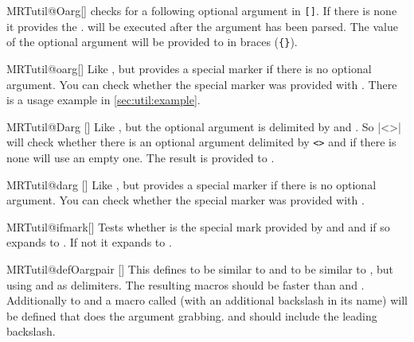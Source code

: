 \begin{describemacro}{MRTutil@Oarg}[]
  checks for a following optional argument in \texttt{[]}. If there is none it
  provides the .  will be executed after the
  argument has been parsed. The value of the optional argument will be provided
  to  in braces (\texttt{\{\}}).
\end{describemacro}

\begin{describemacro}{MRTutil@oarg}[]
  Like , but provides a special marker if there is no optional
  argument. You can check whether the special marker was provided with
  . There is a usage example in \autoref{sec:util:example}.
\end{describemacro}

\begin{describemacro}{MRTutil@Darg}%
  []
  Like , but the optional argument is delimited by
   and . So \bverb|\MRTutil@Darg<>{}\foo| will check
  whether there is an optional argument delimited by \texttt{<>} and if there is
  none will use an empty one. The result is provided to .
\end{describemacro}

\begin{describemacro}{MRTutil@darg}%
  []
  Like , but provides a special marker if there is no optional
  argument. You can check whether the special marker was provided with
  . 
\end{describemacro}

\begin{describemacro}{MRTutil@ifmark}[]
  Tests whether  is the special mark provided by 
  and  and if so expands to . If not it expands to
  .
\end{describemacro}

\begin{describemacro}{MRTutil@defOargpair}
  []
  This defines  to be similar to  and  to
  be similar to , but using  and  as
  delimiters. The resulting macros should be faster than  and
  . Additionally to  and  a macro called
   (with an additional backslash in its name) will be
  defined that does the argument grabbing.  and  should
  include the leading backslash.
\end{describemacro}

